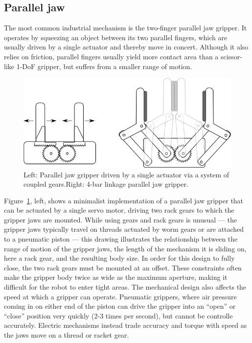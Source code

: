 \subsection{Parallel jaw}
The most common industrial mechanism is the two-finger parallel jaw gripper. It operates by squeezing an object between its two parallel fingers, which are usually driven by a single actuator and thereby move in concert. Although it also relies on friction, parallel fingers usually yield more contact area than a scissor-like 1-DoF gripper, but suffers from a smaller range of motion. 

\begin{figure}
\centering
\includegraphics[width=\columnwidth]{figs/gripper-2-dof}
\caption{Left: Parallel jaw gripper driven by a single actuator via a system of coupled gears.Right: 4-bar linkage parallel jaw gripper. \label{fig:paralleljaw}}
\end{figure}


Figure~\ref{fig:paralleljaw}, left, shows a minimalist implementation of a parallel jaw gripper that can be actuated by a single servo motor, driving two rack gears to which the gripper jaws are mounted. While using gears and rack gears is unusual --- the gripper jaws typically travel on threads actuated by worm gears or are attached to a pneumatic piston --- this drawing illustrates the relationship between the range of motion of the gripper jaws, the length of the mechanism it is sliding on, here a rack gear, and the resulting body size. In order for this design to fully close, the two rack gears must be mounted at an offset. These constraints often make the gripper body twice as wide as the maximum aperture, making it difficult for the robot to enter tight areas. The mechanical design also affects the speed at which a gripper can operate. Pneumatic grippers, where air pressure coming in on either end of the piston can drive the gripper into an ``open'' or ``close'' position very quickly (2-3 times per second), but cannot be controlle accurately. Electric mechanisms instead trade accuracy and torque with speed as the jaws move on a thread or racket gear. 

